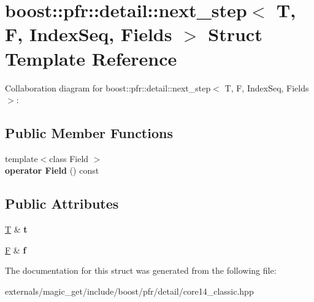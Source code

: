 \hypertarget{structboost_1_1pfr_1_1detail_1_1next__step}{}\section{boost\+:\+:pfr\+:\+:detail\+:\+:next\+\_\+step$<$ T, F, Index\+Seq, Fields $>$ Struct Template Reference}
\label{structboost_1_1pfr_1_1detail_1_1next__step}


Collaboration diagram for boost\+:\+:pfr\+:\+:detail\+:\+:next\+\_\+step$<$ T, F, Index\+Seq, Fields $>$\+:
\subsection*{Public Member Functions}
\begin{DoxyCompactItemize}
\item 
\mbox{\label{structboost_1_1pfr_1_1detail_1_1next__step_a1e65e62abee26aa017c7af1e5fb0424b}} 
{\footnotesize template$<$class Field $>$ }\\{\bfseries operator Field} () const
\end{DoxyCompactItemize}
\subsection*{Public Attributes}
\begin{DoxyCompactItemize}
\item 
\mbox{\label{structboost_1_1pfr_1_1detail_1_1next__step_afbdd388d831377790eac14db25c34ac1}} 
\mbox{\hyperlink{struct_t}{T}} \& {\bfseries t}
\item 
\mbox{\label{structboost_1_1pfr_1_1detail_1_1next__step_a1066f3deda39a6fdf07beff0851a365e}} 
\mbox{\hyperlink{struct_f}{F}} \& {\bfseries f}
\end{DoxyCompactItemize}


The documentation for this struct was generated from the following file\+:\begin{DoxyCompactItemize}
\item 
externals/magic\+\_\+get/include/boost/pfr/detail/core14\+\_\+classic.\+hpp\end{DoxyCompactItemize}
